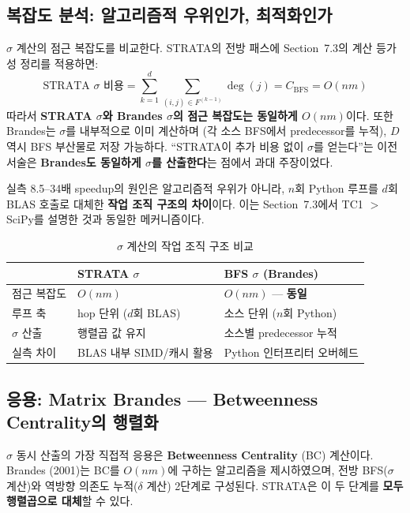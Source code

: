 \documentclass[11pt,a4paper]{article}
\begin{document}
\subsection{복잡도 분석: 알고리즘적 우위인가, 최적화인가}

$\sigma$ 계산의 점근 복잡도를 비교한다. STRATA의 전방 패스에 Section~7.3의 계산 등가성 정리를 적용하면:
\[
\text{STRATA } \sigma \text{ 비용} = \sum_{k=1}^{d} \sum_{(i,j) \in F^{(k-1)}} \deg(j) = C_{\text{BFS}} = O(nm)
\]
따라서 \textbf{STRATA $\sigma$와 Brandes $\sigma$의 점근 복잡도는 동일하게 $O(nm)$}이다. 또한 Brandes는 $\sigma$를 내부적으로 이미 계산하며 (각 소스 BFS에서 predecessor를 누적), $D$ 역시 BFS 부산물로 저장 가능하다. ``STRATA이 추가 비용 없이 $\sigma$를 얻는다''는 이전 서술은 \textbf{Brandes도 동일하게 $\sigma$를 산출한다}는 점에서 과대 주장이었다.

실측 8.5--34배 speedup의 원인은 알고리즘적 우위가 아니라, $n$회 Python 루프를 $d$회 BLAS 호출로 대체한 \textbf{작업 조직 구조의 차이}이다. 이는 Section~7.3에서 TC1 $>$ SciPy를 설명한 것과 동일한 메커니즘이다.

\begin{table}[H]\centering
\caption{$\sigma$ 계산의 작업 조직 구조 비교}
\label{tab:sigma-org}
\small
\begin{tabular}{@{}lll@{}}
\toprule
& \textbf{STRATA $\sigma$} & \textbf{BFS $\sigma$ (Brandes)} \\
\midrule
점근 복잡도 & $O(nm)$ & $O(nm)$ --- \textbf{동일} \\
루프 축 & hop 단위 ($d$회 BLAS) & 소스 단위 ($n$회 Python) \\
$\sigma$ 산출 & 행렬곱 값 유지 & 소스별 predecessor 누적 \\
실측 차이 & BLAS 내부 SIMD/캐시 활용 & Python 인터프리터 오버헤드 \\
\bottomrule
\end{tabular}
\end{table}


\subsection{응용: Matrix Brandes --- Betweenness Centrality의 행렬화}

$\sigma$ 동시 산출의 가장 직접적 응용은 \textbf{Betweenness Centrality} (BC) 계산이다.
Brandes (2001)는 BC를 $O(nm)$에 구하는 알고리즘을 제시하였으며, 전방 BFS($\sigma$ 계산)와 역방향 의존도 누적($\delta$ 계산) 2단계로 구성된다. STRATA은 이 두 단계를 \textbf{모두 행렬곱으로 대체}할 수 있다.
\end{document}
